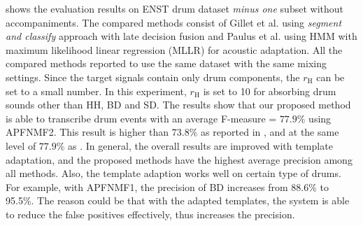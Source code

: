 \documentclass{article}
\begin{document}



 shows the evaluation results on ENST drum dataset \textit{minus one} subset without accompaniments. The compared methods consist of Gillet et al. \cite{gillet_transcription_2008} using \textit{segment and classify} approach with late decision fusion and Paulus et al. \cite{Paulus2009a} using HMM with maximum likelihood linear regression (MLLR) for acoustic adaptation. All the compared methods reported to use the same dataset with the same mixing settings. Since the target signals contain only drum components, the $r_\mathrm{H}$ can be set to a small number. In this experiment, $r_\mathrm{H}$ is set to 10 for absorbing drum sounds other than HH, BD and SD. The results show that our proposed method is able to transcribe drum events with an average F-measure = $77.9\%$ using APFNMF2. This result is higher than $73.8\%$ as reported in \cite{gillet_transcription_2008}, and at the same level of $77.9\%$ as \cite{Paulus2009a}. In general, the overall results are improved with template adaptation, and the proposed methods have the highest average precision among all methods. Also, the template adaption works well on certain type of drums. For example, with APFNMF1, the precision of BD increases from 88.6\% to 95.5\%. The reason could be that with the adapted templates, the system is able to reduce the false positives effectively, thus increases the precision.
     
\end{document}
